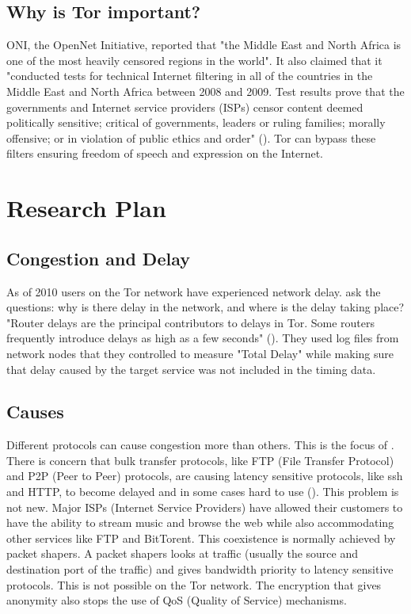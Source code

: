 \documentclass[letterpaper,13pt]{texMemo}
\begin{document}
    \subsection*{Why is Tor important?}
    ONI, the OpenNet Initiative, reported that "the Middle East and North Africa is one of the most
    heavily censored regions in the world". It also claimed that it "conducted tests for technical
    Internet filtering in all of the countries in the Middle East and North Africa between 2008 and
    2009. Test results prove that the governments and Internet service providers (ISPs) censor
    content deemed politically sensitive; critical of governments, leaders or ruling families;
    morally offensive; or in violation of public ethics and order" (\citeauthor[6]{ONI}). Tor can
    bypass these filters ensuring freedom of speech and expression on the Internet.

\section*{Research Plan}


    \subsection*{Congestion and Delay}
    As of 2010 users on the Tor network have experienced network delay. \citeauthor[]{delay} ask the
    questions: why is there delay in the network, and where is the delay taking place? "Router delays
    are the principal contributors to delays in Tor. Some routers frequently introduce delays as
    high as a few seconds" (\citeauthor[3]{delay}). They used log files from network nodes that they
    controlled to measure "Total Delay" while making sure that delay caused by the target service was not
    included in the timing data.

    \subsection*{Causes}
    Different protocols can cause congestion more than others. This is the focus of
    \citeauthor{analysis}. There is concern that bulk transfer protocols, like FTP (File Transfer
    Protocol) and P2P (Peer to Peer) protocols, are causing latency sensitive protocols, like ssh
    and HTTP, to become delayed and in some cases hard to use (\citeauthor[2]{analysis}). This
    problem is not new. Major ISPs (Internet Service Providers) have allowed their customers to have
    the ability to stream music and browse the web while also accommodating other services like FTP
    and BitTorent. This coexistence is normally achieved by packet shapers. A packet shapers looks
    at traffic (usually the source and destination port of the traffic) and gives bandwidth priority
    to latency sensitive protocols. This is not possible on the Tor network. The encryption that
    gives anonymity also stops the use of QoS (Quality of Service) mechanisms.
\end{document}
